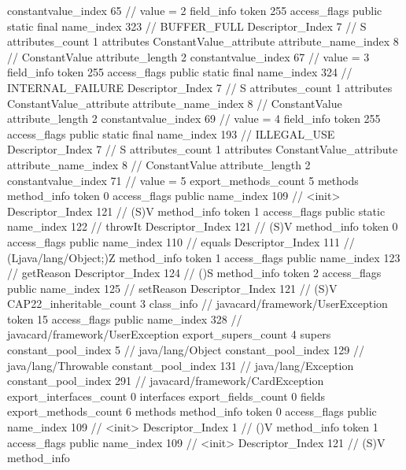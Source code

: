 {{{{{{{					constantvalue_index	65		// value = 2
				}
				}
			}
			field_info {
				token	255
				access_flags	public static final
				name_index	323		// BUFFER_FULL
				Descriptor_Index	7		// S
				attributes_count	1
				attributes {
				ConstantValue_attribute {
					attribute_name_index	8		// ConstantValue
					attribute_length	2
					constantvalue_index	67		// value = 3
				}
				}
			}
			field_info {
				token	255
				access_flags	public static final
				name_index	324		// INTERNAL_FAILURE
				Descriptor_Index	7		// S
				attributes_count	1
				attributes {
				ConstantValue_attribute {
					attribute_name_index	8		// ConstantValue
					attribute_length	2
					constantvalue_index	69		// value = 4
				}
				}
			}
			field_info {
				token	255
				access_flags	public static final
				name_index	193		// ILLEGAL_USE
				Descriptor_Index	7		// S
				attributes_count	1
				attributes {
				ConstantValue_attribute {
					attribute_name_index	8		// ConstantValue
					attribute_length	2
					constantvalue_index	71		// value = 5
				}
				}
			}
			}
			export_methods_count	5
			methods {
				method_info {
					token	0
					access_flags	public
					name_index	109		// <init>
					Descriptor_Index	121		// (S)V
				}
				method_info {
					token	1
					access_flags	public static
					name_index	122		// throwIt
					Descriptor_Index	121		// (S)V
				}
				method_info {
					token	0
					access_flags	public
					name_index	110		// equals
					Descriptor_Index	111		// (Ljava/lang/Object;)Z
				}
				method_info {
					token	1
					access_flags	public
					name_index	123		// getReason
					Descriptor_Index	124		// ()S
				}
				method_info {
					token	2
					access_flags	public
					name_index	125		// setReason
					Descriptor_Index	121		// (S)V
				}
			}
			CAP22_inheritable_count	3
		}
		class_info {		// javacard/framework/UserException
			token	15
			access_flags	public
			name_index	328		// javacard/framework/UserException
			export_supers_count	4
			supers {
				constant_pool_index	5		// java/lang/Object
				constant_pool_index	129		// java/lang/Throwable
				constant_pool_index	131		// java/lang/Exception
				constant_pool_index	291		// javacard/framework/CardException
			}
			export_interfaces_count	0
			interfaces {
			}
			export_fields_count	0
			fields {
			}
			export_methods_count	6
			methods {
				method_info {
					token	0
					access_flags	public
					name_index	109		// <init>
					Descriptor_Index	1		// ()V
				}
				method_info {
					token	1
					access_flags	public
					name_index	109		// <init>
					Descriptor_Index	121		// (S)V
				}
				method_info {
}}}}}
